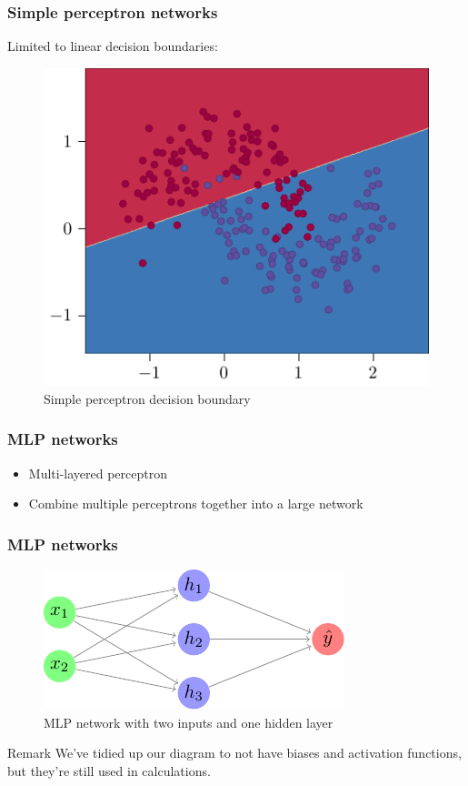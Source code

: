 \documentclass{beamer}
\begin{document}
\begin{frame}
    \frametitle{Simple perceptron networks}
    Limited to linear decision boundaries:
    \begin{figure}
        \centering
        \includegraphics[height=0.6\textheight]{figures/linear-boundary/main.pdf}
        \caption{Simple perceptron decision boundary}
    \end{figure}
\end{frame}

\begin{frame}
    \frametitle{MLP networks}
    \begin{itemize}
        \item Multi-layered perceptron
        \item Combine multiple perceptrons together into a large network
    \end{itemize}
\end{frame}

\begin{frame}
    \frametitle{MLP networks}
    \begin{figure}
        \includegraphics{figures/basic-mlp/main.pdf}
        \caption{MLP network with two inputs and one hidden layer}
    \end{figure}
    \begin{block}{Remark}
        We've tidied up our diagram to not have biases and activation functions, but they're still used in calculations.
    \end{block}
\end{frame}
\end{document}

